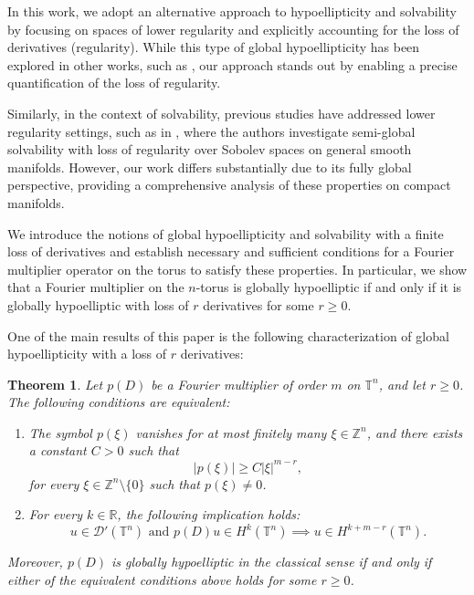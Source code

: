 \documentclass[11pt]{amsart}
\numberwithin{equation}{section}
\newtheorem{theorem}{Theorem}[section]
\theoremstyle{definition}
\begin{document}
 	 In this work, we adopt an alternative approach to hypoellipticity and solvability by focusing on spaces of lower regularity and explicitly accounting for the loss of derivatives (regularity). While this type of global hypoellipticity has been explored in other works, such as \cite{Ferra2023,Ferra2020,FerraPetronilho2021}, our approach stands out by enabling a precise quantification of the loss of regularity.
 	 
 	 Similarly, in the context of solvability, previous studies have addressed lower regularity settings, such as in \cite{CORDARO2016458}, where the authors investigate semi-global solvability with loss of regularity over Sobolev spaces on general smooth manifolds. However, our work differs substantially due to its fully global perspective, providing a comprehensive analysis of these properties on compact manifolds.
 
 	 
 	 We introduce the notions of global hypoellipticity and solvability with a finite loss of derivatives and establish necessary and sufficient conditions for a Fourier multiplier operator on the torus to satisfy these properties. In particular, we show that a Fourier multiplier on the \( n \)-torus is globally hypoelliptic if and only if it is globally hypoelliptic with loss of \( r \) derivatives for some \( r \geq 0 \). 
 	 
 	 One of the main results of this paper is the following characterization of global hypoellipticity with a loss of $ r $ derivatives:
 	 
 	 \begin{theorem}
 	 	Let $ p(D) $ be a Fourier multiplier of order $ m $ on $ \mathbb{T}^n $, and let $ r \geq 0 $. The following conditions are equivalent:
 	 	\begin{enumerate}
 	 		\item The symbol $ p(\xi) $ vanishes for at most finitely many $ \xi \in \mathbb{Z}^n $, and there exists a constant $ C > 0 $ such that  
 	 		\begin{equation*}
 	 		    |p(\xi)| \geq C |\xi|^{m - r},
 	 		\end{equation*} 		
 	 		for every $ \xi \in \mathbb{Z}^n \setminus \{0\} $ such that $ p(\xi) \neq 0 $.
 	 		
 	 		\item For every $ k \in \mathbb{R} $, the following implication holds:
 	 		\[
 	 		u \in \mathscr{D}'(\mathbb{T}^n) \text{ and } p(D)u \in H^k(\mathbb{T}^n) \implies u \in H^{k + m - r}(\mathbb{T}^n).
 	 		\]
 	 	\end{enumerate}
 	 	
 	 	Moreover, $ p(D) $ is globally hypoelliptic in the classical sense if and only if either of the equivalent conditions above holds for some $ r \geq 0 $.
 	 \end{theorem}
 	 
\end{document}
